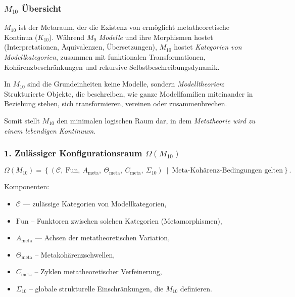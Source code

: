 

\subsubsection{$M_{10}$ Übersicht}
\label{sec:m10-overview}

$M_{10}$ ist der Metaraum, der die Existenz von ermöglicht
metatheoretische Kontinua ($K_{10}$).
Während $M_9$ \emph{Modelle} und ihre Morphismen hostet
(Interpretationen, Äquivalenzen, Übersetzungen),
$M_{10}$ hostet \emph{Kategorien von Modellkategorien},
zusammen mit funktionalen Transformationen,
Kohärenzbeschränkungen und rekursive Selbstbeschreibungsdynamik.

In $M_{10}$ sind die Grundeinheiten keine Modelle, sondern \emph{Modelltheorien}:
Strukturierte Objekte, die beschreiben, wie ganze Modellfamilien miteinander in Beziehung stehen, sich transformieren,
vereinen oder zusammenbrechen.

Somit stellt $M_{10}$ den minimalen logischen Raum dar, in dem
\emph{Metatheorie wird zu einem lebendigen Kontinuum}.

\subsubsection*{1. Zulässiger Konfigurationsraum $\Omega(M_{10})$}

\[
\Omega(M_{10}) =
\left\{
(\mathcal{C},\ \mathrm{Fun},\ A_{\mathrm{meta}},\
\Theta_{\mathrm{meta}},\ C_{\mathrm{meta}},\ \Sigma_{10})
\ \middle|\
\text{Meta-Kohärenz-Bedingungen gelten}
\right\}.
\]

Komponenten:

\begin{itemize}
    \item $\mathcal{C}$ — zulässige Kategorien von Modellkategorien,
    \item $\mathrm{Fun}$ – Funktoren zwischen solchen Kategorien (Metamorphismen),
    \item $A_{\mathrm{meta}}$ — Achsen der metatheoretischen Variation,
    \item $\Theta_{\mathrm{meta}}$ – Metakohärenzschwellen,
    \item $C_{\mathrm{meta}}$ – Zyklen metatheoretischer Verfeinerung,
    \item $\Sigma_{10}$ – globale strukturelle Einschränkungen, die $M_{10}$ definieren.
\end{itemize}

